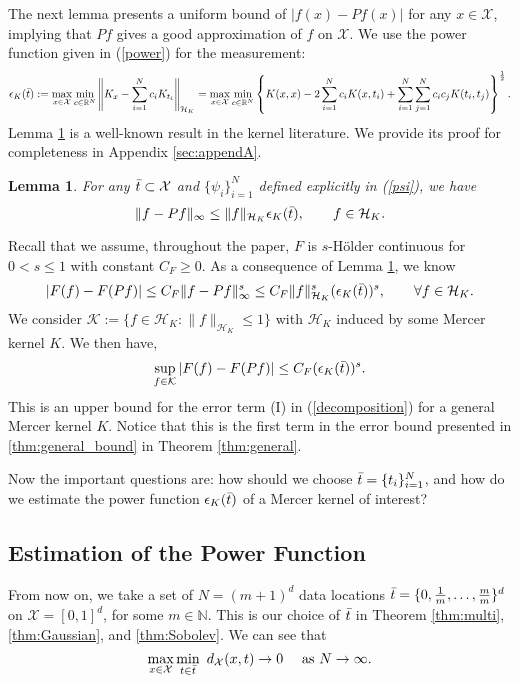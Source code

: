 \documentclass{article}
\def\NN{\mathbb N}
\def\RR{\mathbb R}
\numberwithin{equation}{section}
\newtheorem{lemma}[theorem]{Lemma}
\begin{document}
The next lemma presents a uniform bound of $|f (x)- Pf(x)|$ for any $x\in \mathcal{X}$, implying that $Pf$ gives a good approximation of $f$ on $\mathcal{X}$.  We use the power function given in (\ref{power}) for the measurement: 
\begin{equation*}
    \epsilon_K(\Bar{t}):= \max_{x\in \mathcal{X}} \min_{c\in\RR^N} \left\|K_x -  \sum_{i=1}^N c_i  K_{t_i}\right\|_{\mathcal{H}_K} =\max_{x\in \mathcal{X}} \min_{c\in\RR^N} \left\{ K(x,x) -2 \sum_{i=1}^N c_i K(x,t_i)+ \sum_{i=1}^N \sum_{j=1}^N c_i  c_j K(t_i, t_j)\right\}^{\frac{1}{2}}. 
\end{equation*}
 Lemma \ref{f-Pf} is a well-known result in the kernel literature. We provide its proof for completeness in Appendix \ref{sec:appendA}. 

\begin{lemma}\label{f-Pf}
    For any $\Bar{t} \subset \mathcal{X}$ and $\{\psi_i\}_{i=1}^N$ defined explicitly in (\ref{psi}), we have 
    \begin{equation}
      \|f- Pf\|_\infty \leq \|f\|_{\mathcal{H}_K}  \epsilon_K(\Bar{t}), \qquad f\in \mathcal{H}_K.
    \end{equation}
\end{lemma}

Recall that we assume, throughout the paper, $F$ is $s$-H\"{o}lder continuous for $0<s \leq 1$ with constant $C_F \geq 0$. As a consequence of Lemma \ref{f-Pf}, we know 
\begin{equation*}
    |F(f) - F(Pf)| \leq C_F \|f-Pf\|^s_\infty \leq C_F \|f\|^s_{\mathcal{H}_K}  (\epsilon_K(\Bar{t}))^s , \qquad \forall f \in \mathcal{H}_K.
\end{equation*}
 We consider $
    \mathcal{K} := \{f\in \mathcal{H}_K: \|f\|_{\mathcal{H}_K} \leq 1\}
$ with $\mathcal{H}_K$ induced by some Mercer kernel $K$. We then have, 
\begin{equation}\label{eq:firstterm}
 \sup_{f\in \mathcal{K}}| F(f) - F(Pf)| \leq  C_F   (\epsilon_K(\Bar{t}))^s.
\end{equation}
This is an upper bound for the error term (I) in (\ref{decomposition}) for a general Mercer kernel $K$.
Notice that this is the first term in the error bound presented in \eqref{thm:general_bound} in Theorem \ref{thm:general}. 

Now the important questions are: how should we choose $\Bar{t}=\{t_i\}_{i=1}^N$, and how do we estimate the power function $\epsilon_K(\Bar{t})$ of a Mercer kernel of interest?

\subsection{Estimation of the Power Function}\label{subsec:power}
From now on, we take  a set of $N=(m+1)^d$ data locations $\Bar{t}=\{0, \frac{1}{m},\ldots, \frac{m}{m}\}^d$ on $\mathcal{X} = [0,1]^d$, for some $m\in\NN$. 
This is our choice of $\Bar{t}$ in Theorem \ref{thm:multi}, \ref{thm:Gaussian}, and \ref{thm:Sobolev}.
We can see that $$ \max_{x\in \mathcal{X}} \min_{t\in \Bar{t}} \ d_\mathcal{X}(x,t) \rightarrow 0 \quad \text{ as } N \rightarrow \infty.$$
\end{document}
